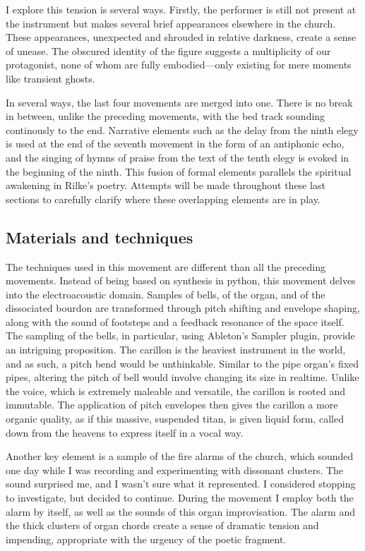 \documentclass[12pt,twoside,maitrise]{dms_ks}
\theoremstyle{definition}
\begin{document}
{I explore this tension is several ways. Firstly, the performer is still not present at the instrument but makes several brief appearances elsewhere in the church. These appearances, unexpected and shrouded in relative darkness, create a sense of unease. The obscured identity of the figure suggests a multiplicity of our protagonist, none of whom are fully embodied—only existing for mere moments like transient ghosts.

In several ways, the last four movements are merged into one. There is no break in between, unlike the preceding movements, with the bed track sounding continously to the end. Narrative elements such as the delay from the ninth elegy is used at the end of the seventh movement in the form of an antiphonic echo, and the singing of hymns of praise from the text of the tenth elegy is evoked in the beginning of the ninth. This fusion of formal elements parallels the spiritual awakening in Rilke’s poetry. Attempts will be made throughout these last sections to carefully clarify where these overlapping elements are in play.

\subsection{Materials and techniques}

The techniques used in this movement are different than all the preceding movements. 
Instead of being based on synthesis in python, this movement delves into the electroacoustic domain. 
Samples of bells, of the organ, and of the dissociated bourdon are transformed through pitch shifting and envelope shaping, along with the sound of footsteps and a feedback resonance of the space itself. 
The sampling of the bells, in particular, using Ableton’s Sampler plugin, provide an intriguing proposition. 
The carillon is the heaviest instrument in the world, and as such, a pitch bend would be unthinkable. 
Similar to the pipe organ's fixed pipes, altering the pitch of bell would involve changing its size in realtime. 
Unlike the voice, which is extremely maleable and versatile, the carillon is rooted and immutable. 
The application of pitch envelopes then gives the carillon a more organic quality, as if this massive, suspended titan, is given liquid form, called down from the heavens to express itself in a vocal way.

Another key element is a sample of the fire alarms of the church, which sounded one day while I was recording and experimenting with dissonant clusters. 
The sound surprised me, and I wasn’t sure what it represented. 
I considered stopping to investigate, but decided to continue. 
During the movement I employ both the alarm by itself, as well as the sounds of this organ improvisation.
The alarm and the thick clusters of organ chords create a sense of dramatic tension and impending, appropriate with the urgency of the poetic fragment. 

}
\end{document}
